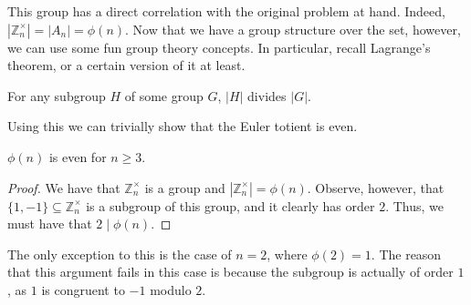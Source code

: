 \documentclass[a4paper, 12pt]{article}
\begin{document}
This group has a direct correlation with the original problem at hand. Indeed, \( |\mathbb{Z}_n^\times| = |A_n| = \phi (n) \). Now that we have a group structure over the set, however, we can use some fun group theory concepts. In particular, recall Lagrange's theorem, or a certain version of it at least.

\begin{sidebox}
    \begin{theorem}
        For any subgroup \( H \) of some group \( G \), \( |H| \) divides \( |G| \).
    \end{theorem}
\end{sidebox}

Using this we can trivially show that the Euler totient is even.

\begin{sidebox}
    \begin{theorem}
        \( \phi(n) \) is even for \( n \ge 3 \).
    \end{theorem}
\end{sidebox}

\begin{proof}
    We have that \( \mathbb{Z}_n^\times \) is a group and \( |\mathbb{Z}_n^\times| = \phi(n) \). Observe, however, that \( \{1, -1\} \subseteq \mathbb{Z}_n^\times \) is a subgroup of this group, and it clearly has order \( 2 \). Thus, we must have that \( 2 \mid \phi(n) \).
\end{proof}

The only exception to this is the case of \( n = 2 \), where \( \phi(2) = 1 \). The reason that this argument fails in this case is because the subgroup is actually of order \( 1 \), as \( 1 \) is congruent to \( -1 \) modulo \( 2 \).
\end{document}
